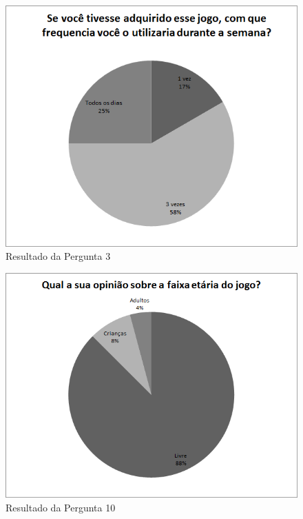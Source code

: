 \begin{figure}[!htb]
     \centering
     \includegraphics[scale=0.7]{./img/chart_3-.png}
     \caption{Resultado da Pergunta 3}
     \label{fig:question3}
\end{figure}


\begin{figure}[!htb]
     \centering
     \includegraphics[scale=0.7]{./img/chart_10-.png}
     \caption{Resultado da Pergunta 10}
     \label{fig:question10}
\end{figure}
\FloatBarrier




